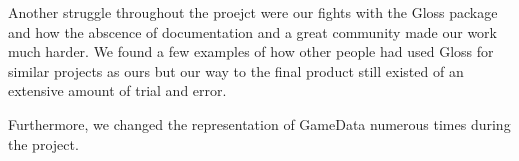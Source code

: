 \documentclass[12pt, a4paper]{article}
\begin{document}
Another struggle throughout the proejct were our fights with the Gloss package and how the abscence of documentation and a great community made our work much harder. We found a few examples of how other people had used Gloss for similar projects as ours but our way to the final product still existed of an extensive amount of trial and error.

Furthermore, we changed the representation of GameData numerous times during the project. 





\end{document}
